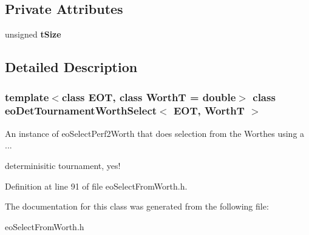 \subsection*{Private Attributes}
\begin{CompactItemize}
\item 
unsigned {\bf t\-Size}\label{classeo_det_tournament_worth_select_r0}

\end{CompactItemize}


\subsection{Detailed Description}
\subsubsection*{template$<$class EOT, class Worth\-T = double$>$ class eo\-Det\-Tournament\-Worth\-Select$<$ EOT, Worth\-T $>$}

An instance of eo\-Select\-Perf2Worth that does selection from the Worthes using a ... 

determinisitic tournament, yes! 



Definition at line 91 of file eo\-Select\-From\-Worth.h.

The documentation for this class was generated from the following file:\begin{CompactItemize}
\item 
eo\-Select\-From\-Worth.h\end{CompactItemize}
